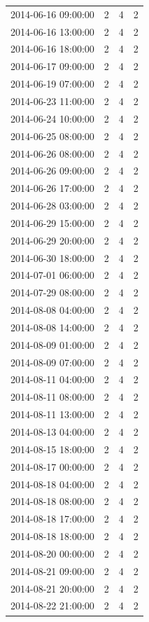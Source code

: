 \begin{tabular}{lrrr}
2014-06-16 09:00:00 & 2 & 4 & 2 \\
2014-06-16 13:00:00 & 2 & 4 & 2 \\
2014-06-16 18:00:00 & 2 & 4 & 2 \\
2014-06-17 09:00:00 & 2 & 4 & 2 \\
2014-06-19 07:00:00 & 2 & 4 & 2 \\
2014-06-23 11:00:00 & 2 & 4 & 2 \\
2014-06-24 10:00:00 & 2 & 4 & 2 \\
2014-06-25 08:00:00 & 2 & 4 & 2 \\
2014-06-26 08:00:00 & 2 & 4 & 2 \\
2014-06-26 09:00:00 & 2 & 4 & 2 \\
2014-06-26 17:00:00 & 2 & 4 & 2 \\
2014-06-28 03:00:00 & 2 & 4 & 2 \\
2014-06-29 15:00:00 & 2 & 4 & 2 \\
2014-06-29 20:00:00 & 2 & 4 & 2 \\
2014-06-30 18:00:00 & 2 & 4 & 2 \\
2014-07-01 06:00:00 & 2 & 4 & 2 \\
2014-07-29 08:00:00 & 2 & 4 & 2 \\
2014-08-08 04:00:00 & 2 & 4 & 2 \\
2014-08-08 14:00:00 & 2 & 4 & 2 \\
2014-08-09 01:00:00 & 2 & 4 & 2 \\
2014-08-09 07:00:00 & 2 & 4 & 2 \\
2014-08-11 04:00:00 & 2 & 4 & 2 \\
2014-08-11 08:00:00 & 2 & 4 & 2 \\
2014-08-11 13:00:00 & 2 & 4 & 2 \\
2014-08-13 04:00:00 & 2 & 4 & 2 \\
2014-08-15 18:00:00 & 2 & 4 & 2 \\
2014-08-17 00:00:00 & 2 & 4 & 2 \\
2014-08-18 04:00:00 & 2 & 4 & 2 \\
2014-08-18 08:00:00 & 2 & 4 & 2 \\
2014-08-18 17:00:00 & 2 & 4 & 2 \\
2014-08-18 18:00:00 & 2 & 4 & 2 \\
2014-08-20 00:00:00 & 2 & 4 & 2 \\
2014-08-21 09:00:00 & 2 & 4 & 2 \\
2014-08-21 20:00:00 & 2 & 4 & 2 \\
2014-08-22 21:00:00 & 2 & 4 & 2 \\

\end{tabular}
